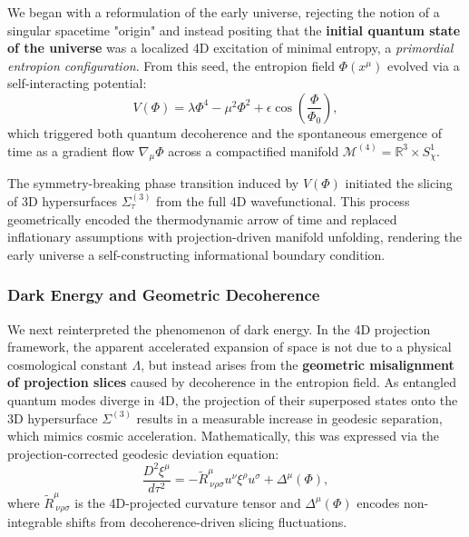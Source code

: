 \documentclass[12pt]{article}
\begin{document}
We began with a reformulation of the early universe, rejecting the notion of a singular spacetime "origin" and instead positing that the \textbf{initial quantum state of the universe} was a localized 4D excitation of minimal entropy, a \emph{primordial entropion configuration}. From this seed, the entropion field $\Phi(x^\mu)$ evolved via a self-interacting potential:
\begin{equation}
V(\Phi) = \lambda \Phi^4 - \mu^2 \Phi^2 + \epsilon \cos\left(\frac{\Phi}{\Phi_0}\right),
\label{eq:entropion-potential}
\end{equation}
which triggered both quantum decoherence and the spontaneous emergence of time as a gradient flow $\nabla_\mu \Phi$ across a compactified manifold $\mathcal{M}^{(4)} = \mathbb{R}^3 \times S^1_\chi$.

The symmetry-breaking phase transition induced by $V(\Phi)$ initiated the slicing of 3D hypersurfaces $\Sigma^{(3)}_\tau$ from the full 4D wavefunctional. This process geometrically encoded the thermodynamic arrow of time and replaced inflationary assumptions with projection-driven manifold unfolding, rendering the early universe a self-constructing informational boundary condition.

\subsubsection*{Dark Energy and Geometric Decoherence}

We next reinterpreted the phenomenon of dark energy. In the 4D projection framework, the apparent accelerated expansion of space is not due to a physical cosmological constant $\Lambda$, but instead arises from the \textbf{geometric misalignment of projection slices} caused by decoherence in the entropion field. As entangled quantum modes diverge in 4D, the projection of their superposed states onto the 3D hypersurface $\Sigma^{(3)}$ results in a measurable increase in geodesic separation, which mimics cosmic acceleration. Mathematically, this was expressed via the projection-corrected geodesic deviation equation:
\begin{equation}
\frac{D^2 \xi^\mu}{d\tau^2} = -\widetilde{R}^\mu_{\ \nu\rho\sigma} u^\nu \xi^\rho u^\sigma + \Delta^\mu(\Phi),
\label{eq:modified-geodesic-deviation}
\end{equation}
where $\widetilde{R}^\mu_{\ \nu\rho\sigma}$ is the 4D-projected curvature tensor and $\Delta^\mu(\Phi)$ encodes non-integrable shifts from decoherence-driven slicing fluctuations.
\end{document}
